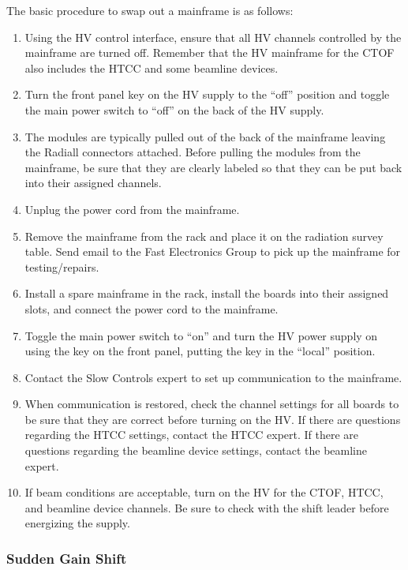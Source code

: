 \documentclass[12pt]{article}
\begin{document}
The basic procedure to swap out a mainframe is as follows:

\begin{enumerate}
\item Using the HV control interface, ensure that all HV channels controlled by the
mainframe are turned off. Remember that the HV mainframe for the CTOF also includes 
the HTCC and some beamline devices.
\item Turn the front panel key on the HV supply to the ``off'' position and toggle 
the main power switch to ``off'' on the back of the HV supply.
\item The modules are typically pulled out of the back of the mainframe leaving the 
Radiall connectors attached. Before pulling the modules from the mainframe, be sure 
that they are clearly labeled so that they can be put back into their assigned channels.
\item Unplug the power cord from the mainframe.
\item Remove the mainframe from the rack and place it on the radiation survey table. 
Send email to the Fast Electronics Group to pick up the mainframe for testing/repairs.
\item Install a spare mainframe in the rack, install the boards into their assigned 
slots, and connect the power cord to the mainframe.
\item Toggle the main power switch to ``on'' and turn the HV power supply on using the 
key on the front panel, putting the key in the ``local'' position.
\item Contact the Slow Controls expert to set up communication to the mainframe.
\item When communication is restored, check the channel settings for all boards to be 
sure that they are correct before turning on the HV. If there are questions regarding 
the HTCC settings, contact the HTCC expert. If there are questions regarding the
beamline device settings, contact the beamline expert.
\item If beam conditions are acceptable, turn on the HV for the CTOF, HTCC, and
beamline device channels. Be sure to check with the shift leader before energizing 
the supply.
\end{enumerate}

\subsubsection{Sudden Gain Shift}
\label{gain-shift}
\end{document}
